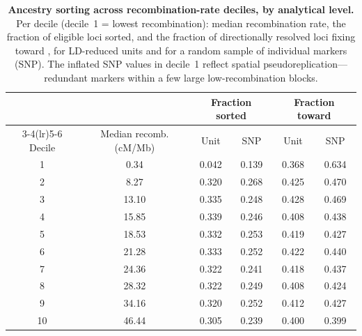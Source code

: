 \begin{table}[h]
\centering
\caption{\textbf{Ancestry sorting across recombination-rate deciles, by
analytical level.} Per decile (decile~1 = lowest recombination): median
recombination rate, the fraction of eligible loci sorted, and the fraction of
directionally resolved loci fixing toward \Faq{}, for LD-reduced units and for a
random sample of individual markers (SNP). The inflated SNP values in decile~1
reflect spatial pseudoreplication---redundant markers within a few large
low-recombination blocks.}
\label{tabS:sorting_by_level}
\begin{tabular}{cccccc}
\toprule
 & & \multicolumn{2}{c}{Fraction sorted} & \multicolumn{2}{c}{Fraction toward \Faq{}} \\
\cmidrule(lr){3-4}\cmidrule(lr){5-6}
Decile & Median recomb. (cM/Mb) & Unit & SNP & Unit & SNP \\
\midrule
1 & 0.34 & 0.042 & 0.139 & 0.368 & 0.634 \\
2 & 8.27 & 0.320 & 0.268 & 0.425 & 0.470 \\
3 & 13.10 & 0.335 & 0.248 & 0.428 & 0.469 \\
4 & 15.85 & 0.339 & 0.246 & 0.408 & 0.438 \\
5 & 18.53 & 0.332 & 0.253 & 0.419 & 0.427 \\
6 & 21.28 & 0.333 & 0.252 & 0.422 & 0.440 \\
7 & 24.36 & 0.322 & 0.241 & 0.418 & 0.437 \\
8 & 28.32 & 0.322 & 0.249 & 0.408 & 0.424 \\
9 & 34.16 & 0.320 & 0.252 & 0.412 & 0.427 \\
10 & 46.44 & 0.305 & 0.239 & 0.400 & 0.399 \\
\bottomrule
\end{tabular}
\end{table}
